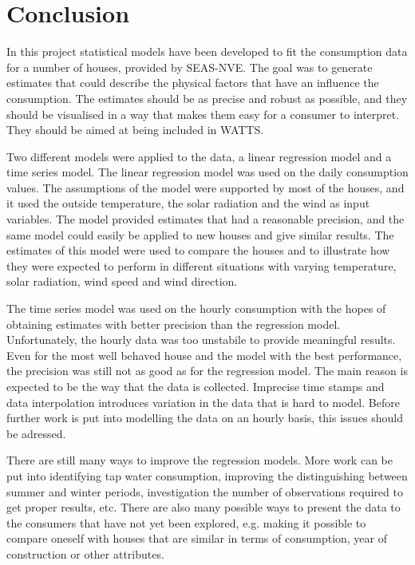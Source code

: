 \chapter{Conclusion}
In this project statistical models have been developed to fit the consumption data for a number of houses, provided by SEAS-NVE. The goal was to generate estimates that could describe the physical factors that have an influence the consumption. The estimates should be as precise and robust as possible, and they should be visualised in a way that makes them easy for a consumer to interpret. They should be aimed at being included in WATTS.

\noindent Two different models were applied to the data, a linear regression model and a time series model. The linear regression model was used on the daily consumption values. The assumptions of the model were supported by most of the houses, and it used the outside temperature, the solar radiation and the wind as input variables. The model provided estimates that had a reasonable precision, and the same model could easily be applied to new houses and give similar results. The estimates of this model were used to compare the houses and to illustrate how they were expected to perform in different situations with varying temperature, solar radiation, wind speed and wind direction.

\noindent The time series model was used on the hourly consumption with the hopes of obtaining estimates with better precision than the regression model. Unfortunately, the hourly data was too unstabile to provide meaningful results. Even for the most well behaved house and the model with the best performance, the precision was still not as good as for the regression model. The main reason is expected to be the way that the data is collected. Imprecise time stamps and data interpolation introduces variation in the data that is hard to model. Before further work is put into modelling the data on an hourly basis, this issues should be adressed.

\noindent There are still many ways to improve the regression models. More work can be put into identifying tap water consumption, improving the distinguishing between summer and winter periods, investigation the number of observations required to get proper results, etc. There are also many possible ways to present the data to the consumers that have not yet been explored, e.g. making it possible to compare oneself with houses that are similar in terms of consumption, year of construction or other attributes.

